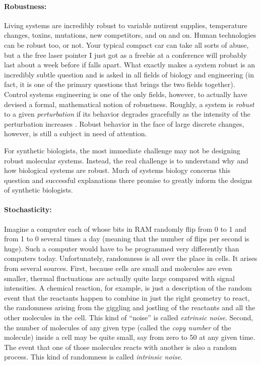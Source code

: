 \paragraph{Robustness:} Living systems are incredibly robust to
variable nutirent supplies, temperature changes, toxins, mutations,
new competitors, and on and on. Human technologies can be robust too,
or not. Your typical compact car can take all sorts of abuse, but a
the free laser pointer I just got as a freebie at a conference will
probably last about a week before if falls apart. What exactly makes a
system robust is an incredibly subtle question and is asked in all
fields of biology and engineering (in fact, it is one of the primary
questions that brings the two fields together). Control systems
engineering is one of the only fields, however, to actually have
devised a formal, mathematical notion of robustness. Roughly, a system
is {\em robust} to a given {\em perturbation} if its behavior degrades
gracefully as the intensity of the perturbation increases
\cite{robust-control}. Robust behavior in the face of large discrete
changes, however, is still a subject in need of attention.

For synthetic biologists, the most immediate challenge may not be
designing robust molecular systems. Instead, the real challenge is to
understand why and how biological systems are robust. Much of systems
biology concerns this question
\cite{heat-shock,calcium,more-robustness-papers} and successful
explanations there promise to greatly inform the designs of synthetic
biologists.

\paragraph{Stochasticity:} Imagine a computer each of whose bits in
RAM randomly flip from 0 to 1 and from 1 to 0 several times a day
(meaning that the number of flips per second is huge). Such a computer
would have to be programmed very differently than computers
today. Unfortunately, randomness is all over the place in cells. It
arises from several sources. First, because cells are small and
molecules are even smaller, thermal fluctuations are actually quite
large compared with signal intensities. A chemical reaction, for
example, is just a description of the random event that the reactants
happen to combine in just the right geometry to react, the randomness
arising from the giggling and jostling of the reactants and all the
other molecules in the cell. This kind of ``noise'' is called {\em
  extrinsic noise}. Second, the number of molecules of any given type
(called the {\em copy number} of the molecule) inside a cell may be
quite small, say from zero to 50 at any given time. The event that one
of those molecules reacts with another is also a random process. This
kind of randomness is called {\em intrinsic noise}. 

